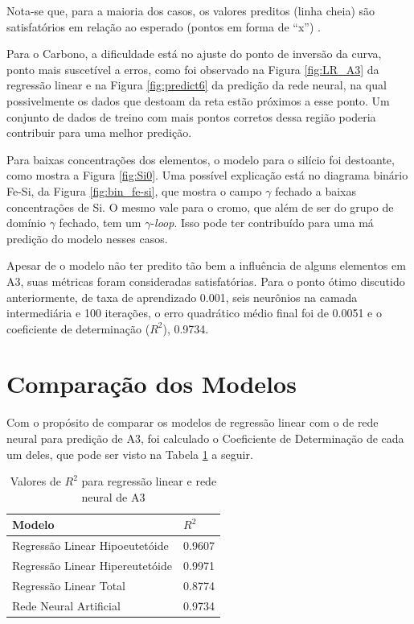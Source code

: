 \documentclass[brazil,tf,epusp]{usp}  %
\begin{document}
Nota-se que, para a maioria dos casos, os valores preditos (linha cheia) são satisfatórios em relação ao esperado (pontos em forma de ``x'') .

Para o Carbono, a dificuldade está no ajuste do ponto de inversão da curva, ponto mais suscetível a erros, como foi observado na Figura \ref{fig:LR_A3} da regressão linear e na Figura \ref{fig:predict6} da predição da rede neural, na qual possivelmente os dados que destoam da reta estão próximos a esse ponto. Um conjunto de dados de treino com mais pontos corretos dessa região poderia contribuir para uma melhor predição.

Para baixas concentrações dos elementos, o modelo para o silício foi destoante, como mostra a Figura \ref{fig:Si0}. Uma possível explicação está no diagrama binário Fe-Si, da Figura \ref{fig:bin_fe-si}, que mostra o campo $\gamma$ fechado a baixas concentrações de Si. O mesmo vale para o cromo, que além de ser do grupo de domínio $\gamma$ fechado, tem um $\gamma$-\textit{loop}. Isso pode ter contribuído para uma má predição do modelo nesses casos.

Apesar de o modelo não ter predito tão bem a influência de alguns elementos em A3, suas métricas foram consideradas satisfatórias. Para o ponto ótimo discutido anteriormente, de taxa de aprendizado 0.001, seis neurônios na camada intermediária e 100 iterações, o erro quadrático médio final foi de 0.0051 e o coeficiente de determinação ($R^{2}$), 0.9734.

\section{Comparação dos Modelos}

Com o propósito de comparar os modelos de regressão linear com o de rede neural para predição de A3, foi calculado o Coeficiente de Determinação de cada um deles, que pode ser visto na Tabela \ref{tab:r2_comparacao} a seguir.

\begin{table}
  \caption{Valores de $R^{2}$ para regressão linear e rede neural de A3}

  \begin{tabular}{ll}
  \hline
  Modelo                          & $R^{2}$ \\
  \hline
  Regressão Linear Hipoeutetóide  & 0.9607  \\
  Regressão Linear Hipereutetóide & 0.9971  \\
  Regressão Linear Total          & 0.8774  \\
  Rede Neural Artificial          & 0.9734  \\
  \hline
  \end{tabular}

  \label{tab:r2_comparacao}
\end{table}
\end{document}
